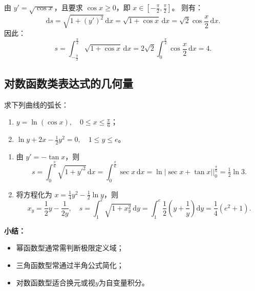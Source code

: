 \begin{solution}
    由 $y' = \sqrt{\cos x}$，且要求 $\cos x \ge 0$，即 $x \in \left[-\tfrac{\pi}{2}, \tfrac{\pi}{2}\right]$。
    则有：
    $$
        \mathrm{d}s = \sqrt{1 + (y')^2}\, \mathrm{d}x
        = \sqrt{1 + \cos x}\, \mathrm{d}x
        = \sqrt{2}\cos \frac{x}{2}\, \mathrm{d}x.
    $$
    因此：
    $$
        s = \int_{-\frac{\pi}{2}}^{\frac{\pi}{2}} \sqrt{1 + \cos x}\, \mathrm{d}x
        = 2\sqrt{2} \int_{0}^{\frac{\pi}{2}} \cos \frac{x}{2}\, \mathrm{d}x
        = 4.
    $$
\end{solution}

\subsection{对数函数类表达式的几何量}
\begin{example}{}{}
    求下列曲线的弧长：
    \begin{enumerate}
        \item $y = \ln(\cos x),\quad 0 \le x \le \tfrac{\pi}{6}$；
        \item $\ln y + 2x - \tfrac{1}{2}y^2 = 0,\quad 1 \le y \le e$。
    \end{enumerate}
\end{example}

\begin{solution}
    \begin{enumerate}
        \item 由 $y' = -\tan x$，则
              $$
                  s = \int_{0}^{\frac{\pi}{6}} \sqrt{1 + y'^2}\, \mathrm{d}x
                  = \int_{0}^{\frac{\pi}{6}} \sec x\, \mathrm{d}x
                  = \ln|\sec x + \tan x|\Big|_{0}^{\frac{\pi}{6}}
                  = \tfrac{1}{2}\ln 3.
              $$
        \item 将方程化为 $x = \tfrac{1}{4}y^2 - \tfrac{1}{2}\ln y$，则
              $$
                  x_y = \frac{1}{2}y - \frac{1}{2y}, \quad
                  s = \int_{1}^{e} \sqrt{1 + x_y^2}\, \mathrm{d}y
                  = \int_{1}^{e} \frac{1}{2}\!\left(y + \frac{1}{y}\right)\mathrm{d}y
                  = \frac{1}{4}(e^2 + 1).
              $$
    \end{enumerate}
\end{solution}

\vspace{1em}
\noindent\textbf{小结：}
\begin{itemize}
    \item 幂函数型通常需判断极限定义域；
    \item 三角函数型常通过半角公式简化；
    \item 对数函数型适合换元或视$y$为自变量积分。
\end{itemize}